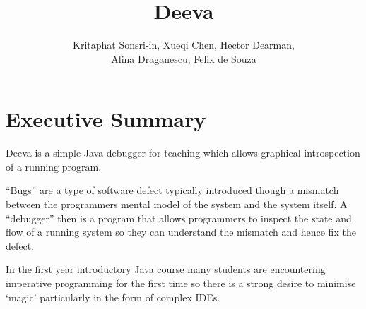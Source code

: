 \documentclass[11pt, a4paper]{article}
\newcommand{\subtitle}[1]{
  \posttitle{
    \par\end{center}
    \begin{center}\large#1\end{center}
    \vskip0.5em}
}
\begin{document}
\title{Deeva}
\subtitle{Final Report}
\author{Kritaphat Sonsri-in, Xueqi Chen, Hector Dearman, \\Alina Draganescu, Felix de Souza}

\maketitle







\section{Executive Summary}

Deeva is a simple Java debugger for teaching which allows graphical introspection of a running program.

``Bugs'' are a type of software defect typically introduced though a mismatch between the programmers mental model of the system and the system itself.
A ``debugger'' then is a program that allows programmers to inspect the state and flow of a running system so they can understand the mismatch and hence fix the defect.

In the first year introductory Java course many students are encountering imperative programming for the first time so there is a strong desire  to minimise `magic' particularly in the form of complex IDEs.
\end{document}
